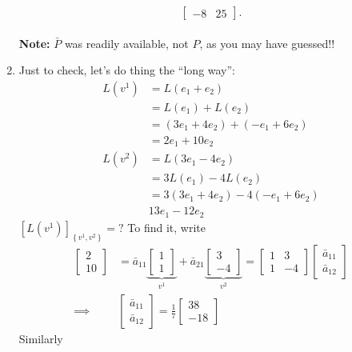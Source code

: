 \documentclass[11pt,twoside]{nsf_jwg} %
\begin{document}
\begin{enumerate}
\[\begin{bmatrix}
-8 & 25
\end{bmatrix}.\]\\
\textbf{Note:} $\bar{P}$ was readily available, not $P$,
as you may have guessed!!
\item Just to check, let's do thing the {}``long way'':\\
\begin{align*}
L\left(v^{1}\right) & =L\left(e_{1}+e_{2}\right)\\
 & =L\left(e_{1}\right)+L\left(e_{2}\right)\\
 & =\left(3e_{1}+4e_{2}\right)+\left(-e_{1}+6e_{2}\right)\\
 & =2e_{1}+10e_{2}\\
L\left(v^{2}\right) & =L\left(3e_{1}-4e_{2}\right)\\
 & =3L\left(e_{1}\right)-4L\left(e_{2}\right)\\
 & =3\left(3e_{1}+4e_{2}\right)-4\left(-e_{1}+6e_{2}\right)\\
 & 13e_{1}-12e_{2}
\end{align*}
$\left[L\left(v^{1}\right)\right]_{\left\{ v^{1},v^{2}\right\} }=?$
To find it, write
\begin{align*}
\begin{bmatrix}2\\
10
\end{bmatrix} & =\bar{a}_{11}\underbrace{\begin{bmatrix}1\\
1
\end{bmatrix}}_{v^{1}}+\bar{a}_{21}\underbrace{\begin{bmatrix}3\\
-4
\end{bmatrix}}_{v^{2}}=\begin{bmatrix}1 & 3\\
1 & -4
\end{bmatrix}\begin{bmatrix}\bar{a}_{11}\\
\bar{a}_{12}
\end{bmatrix}\\
\implies & \begin{bmatrix}\bar{a}_{11}\\
\bar{a}_{12}
\end{bmatrix}=\frac{1}{7}\begin{bmatrix}38\\
-18
\end{bmatrix}
\end{align*}
Similarly
\begin{align*}

\end{align*}
\end{enumerate}
\end{document}
